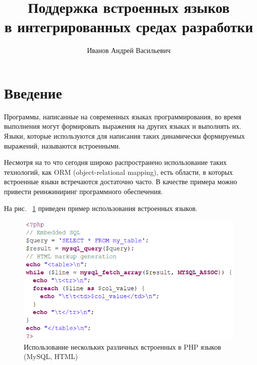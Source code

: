 \title{Поддержка встроенных языков \\ в интегрированных средах разработки}
%

\author{Иванов Андрей Васильевич}
%
%
%

\maketitle              %
\section*{Введение}

Программы, написанные на современных языках программирования, во время выполнения могут формировать 
выражения на других языках и выполнять их. Языки, которые используются для написания таких динамически 
формируемых выражений, называются встроенными. 

Несмотря на то что сегодня широко распространено использование таких технологий, как ORM (object-relational mapping), 
есть области, в которых встроенные языки встречаются достаточно часто. В качестве примера можно привести реинжиниринг 
программного обеспечения. 

На рис. ~\ref{PHP} приведен пример использования встроенных языков.

\begin{figure}[h]
\centering
\includegraphics[width=\linewidth]{Ivanov/Pictures/PHP.png}
\caption{Использование нескольких различных встроенных в PHP языков (MySQL, HTML)}
\label{PHP}
\end{figure}

